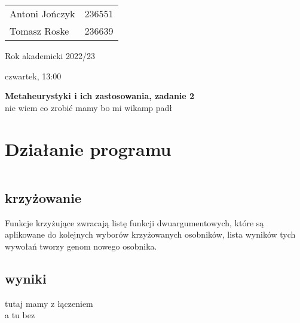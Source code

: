 \documentclass{article}
\begin{document}
\begin{minipage}{0.35\linewidth}
	\begin{tabular}{lr}
		Antoni Jończyk & 236551 \\
		Tomasz Roske   & 236639
	\end{tabular} \hfill
\end{minipage}
\hfill
\begin{minipage}{0.35\linewidth}
	\hfill Rok akademicki 2022/23 \par
	\hfill czwartek, 13:00
\end{minipage}
\bigskip \bigskip \bigskip \bigskip \bigskip
\begin{center}
	\textbf{Metaheurystyki i ich zastosowania, zadanie 2}\\
	\bigskip
	\large nie wiem co zrobić mamy bo mi wikamp padł
\end{center}
\bigskip \bigskip
\section{Działanie programu}
\inputminted{clojure}{snippets/alg.clj_advance}
\subsection{krzyżowanie}
Funkcje krzyżujące zwracają listę funkcji dwuargumentowych, które są aplikowane
do kolejnych wyborów krzyżowanych osobników, lista wyników tych wywołań tworzy
genom nowego osobnika.
\subsection{wyniki}
tutaj mamy z łączeniem \\

a tu bez \\

\end{document}
